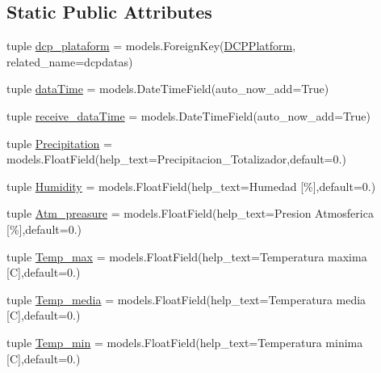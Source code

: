 \subsection*{Static Public Attributes}
\begin{DoxyCompactItemize}
\item 
tuple \hyperlink{class_ground_segment_1_1models_1_1_d_c_p_data_1_1_d_c_p_data_a584ad2be92bab5bbc186254ca2c12aaf}{dcp\+\_\+plataform} = models.\+Foreign\+Key(\hyperlink{class_ground_segment_1_1models_1_1_d_c_p_platform_1_1_d_c_p_platform}{D\+C\+P\+Platform}, related\+\_\+name=\textquotesingle{}dcpdatas\textquotesingle{})
\item 
tuple \hyperlink{class_ground_segment_1_1models_1_1_d_c_p_data_1_1_d_c_p_data_a121dde46715a8dac99e56d9f8db230c4}{data\+Time} = models.\+Date\+Time\+Field(auto\+\_\+now\+\_\+add=True)
\item 
tuple \hyperlink{class_ground_segment_1_1models_1_1_d_c_p_data_1_1_d_c_p_data_af6a317c57d56f2baa06974573482ce00}{receive\+\_\+data\+Time} = models.\+Date\+Time\+Field(auto\+\_\+now\+\_\+add=True)
\item 
tuple \hyperlink{class_ground_segment_1_1models_1_1_d_c_p_data_1_1_d_c_p_data_aba6958f5451f5d205ecae7c0f2847e23}{Precipitation} = models.\+Float\+Field(help\+\_\+text=\textquotesingle{}Precipitacion\+\_\+\+Totalizador\textquotesingle{},default=0.)
\item 
tuple \hyperlink{class_ground_segment_1_1models_1_1_d_c_p_data_1_1_d_c_p_data_abd1efe8c1bc0b27d851986745739895d}{Humidity} = models.\+Float\+Field(help\+\_\+text=\textquotesingle{}Humedad \mbox{[}\%\mbox{]}\textquotesingle{},default=0.)
\item 
tuple \hyperlink{class_ground_segment_1_1models_1_1_d_c_p_data_1_1_d_c_p_data_ade7e93d0f73342d4dc29fed05b5e9766}{Atm\+\_\+preasure} = models.\+Float\+Field(help\+\_\+text=\textquotesingle{}Presion Atmosferica \mbox{[}\%\mbox{]}\textquotesingle{},default=0.)
\item 
tuple \hyperlink{class_ground_segment_1_1models_1_1_d_c_p_data_1_1_d_c_p_data_aed7551a48b3a39d0aab944854b22943a}{Temp\+\_\+max} = models.\+Float\+Field(help\+\_\+text=\textquotesingle{}Temperatura maxima \mbox{[}C\mbox{]}\textquotesingle{},default=0.)
\item 
tuple \hyperlink{class_ground_segment_1_1models_1_1_d_c_p_data_1_1_d_c_p_data_a9446054eb2058c3125d004cbf09e2278}{Temp\+\_\+media} = models.\+Float\+Field(help\+\_\+text=\textquotesingle{}Temperatura media \mbox{[}C\mbox{]}\textquotesingle{},default=0.)
\item 
tuple \hyperlink{class_ground_segment_1_1models_1_1_d_c_p_data_1_1_d_c_p_data_afb341524b4476336e7ccc85e01acbee1}{Temp\+\_\+min} = models.\+Float\+Field(help\+\_\+text=\textquotesingle{}Temperatura minima \mbox{[}C\mbox{]}\textquotesingle{},default=0.)
\end{DoxyCompactItemize}


